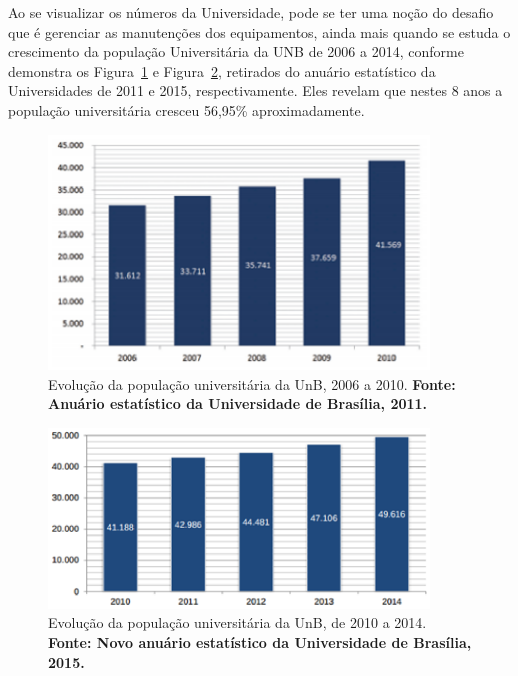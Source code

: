 Ao se visualizar os números da Universidade, pode se ter uma noção do desafio que é gerenciar as manutenções dos equipamentos, ainda mais quando se estuda o crescimento da população Universitária da UNB de 2006 a 2014, conforme demonstra os Figura~\ref{grafico_dimeq1} e Figura~\ref{grafico_dimeq2}, retirados do anuário estatístico da Universidades de 2011 e 2015, respectivamente. Eles revelam que nestes 8 anos a população universitária cresceu 56,95\% aproximadamente.

\graphicspath{{figuras/}}
\begin{figure}[h]
\centering
\includegraphics[width=0.9\textwidth]{grafico_dimeq1}
\caption{Evolução da população universitária da UnB, 2006 a 2010. \textbf{Fonte: Anuário estatístico da Universidade de Brasília, 2011.}}
\label{grafico_dimeq1}
\end{figure}


\graphicspath{{figuras/}}
\begin{figure}[h]
\centering
\includegraphics[width=0.9\textwidth]{grafico_dimeq2.eps}
\caption{Evolução da população universitária da UnB, de 2010 a 2014. \textbf{Fonte: Novo anuário estatístico da Universidade de Brasília, 2015.}}
\label{grafico_dimeq2}
\end{figure}

